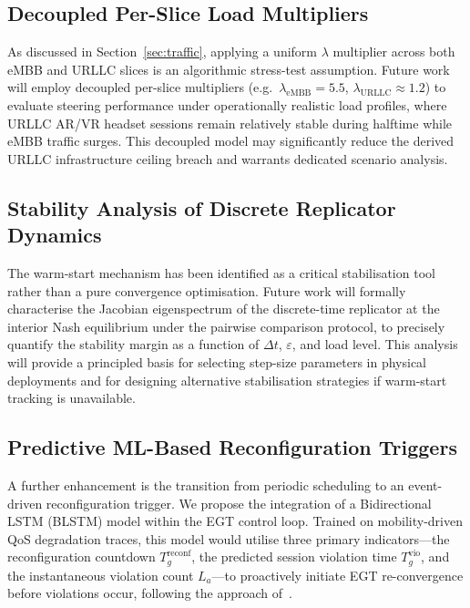 \documentclass[conference]{IEEEtran}
\begin{document}
\subsection{Decoupled Per-Slice Load Multipliers}

As discussed in Section~\ref{sec:traffic}, applying a uniform
$\lambda$ multiplier across both eMBB and URLLC slices is an
algorithmic stress-test assumption. Future work will employ
decoupled per-slice multipliers (e.g.\ $\lambda_\text{eMBB}
= 5.5$, $\lambda_\text{URLLC} \approx 1.2$) to evaluate
steering performance under operationally realistic load
profiles, where URLLC AR/VR headset sessions remain relatively
stable during halftime while eMBB traffic surges. This
decoupled model may significantly reduce the derived URLLC
infrastructure ceiling breach and warrants dedicated scenario
analysis.

\subsection{Stability Analysis of Discrete Replicator Dynamics}

The warm-start mechanism has been identified as a critical
stabilisation tool rather than a pure convergence optimisation.
Future work will formally characterise the Jacobian eigenspectrum
of the discrete-time replicator at the interior Nash equilibrium
under the pairwise comparison protocol, to precisely quantify
the stability margin as a function of $\Delta t$, $\varepsilon$,
and load level. This analysis will provide a principled basis
for selecting step-size parameters in physical deployments and
for designing alternative stabilisation strategies if
warm-start tracking is unavailable.

\subsection{Predictive ML-Based Reconfiguration Triggers}

A further enhancement is the transition from periodic
scheduling to an event-driven reconfiguration trigger.
We propose the integration of a Bidirectional LSTM
(BLSTM) model within the EGT control loop. Trained on
mobility-driven QoS degradation traces, this model
would utilise three primary indicators---the
reconfiguration countdown $T_g^{\text{reconf}}$, the
predicted session violation time $T_{g}^{\text{vio}}$,
and the instantaneous violation count $L_a$---to
proactively initiate EGT re-convergence before
violations occur, following the approach of~\cite{LeyvaUPC2023}.
\end{document}
